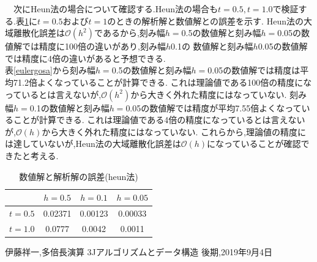 \documentclass[dvipdfmx]{jarticle}
\begin{document}
  　次にHeun法の場合について確認する.Heun法の場合も$t=0.5,t=1.0$で検証する.表\ref{heungosa}に$t=0.5$および$t=1$のときの解析解と数値解との誤差を示す.
  Heun法の大域離散化誤差は$\mathcal{O}(h^2)$であるから,刻み幅$h=$0.5の数値解と刻み幅$h=$0.05の数値解では精度に100倍の違いがあり,刻み幅$h$0.1の
  数値解と刻み幅$h$0.05の数値解では精度に4倍の違いがあると予想できる.\\
  表\ref{eulergosa}から刻み幅$h=$0.5の数値解と刻み幅$h=$0.05の数値解では精度は平均71.2倍よくなっていることが計算できる.
  これは理論値である100倍の精度になっているとは言えないが,$\mathcal{O}(h^2)$から大きく外れた精度にはなっていない.
  刻み幅$h=$0.1の数値解と刻み幅$h=$0.05の数値解では精度が平均7.55倍よくなっていることが計算できる.
  これは理論値である4倍の精度になっているとは言えないが,$\mathcal{O}(h)$から大きく外れた精度にはなっていない.
  これらから,理論値の精度には達していないが,Heun法の大域離散化誤差は$\mathcal{O}(h)$になっていることが確認できたと考える.

  \begin{table}[H]
    \caption{数値解と解析解の誤差(heun法)}
  \label{heungosa}
  \begin{center}
      \begin{tabular}{c|c|c|c}\hline 
        & $h=0.5$ & $h=0.1$ & $h=0.05$ \\ \hline \hline 
        $t=0.5$ & 0.02371 & 0.00123 & 0.00033 \\ 
        $t=1.0$ & 0.0777 & 0.0042 & 0.0011 \\ \hline
      \end{tabular}
  \end{center}
  \end{table}    


        \begin{thebibliography}{9}
            伊藤祥一,多倍長演算 3Jアルゴリズムとデータ構造 後期,2019年9月4日
          \end{thebibliography}
\end{document}
